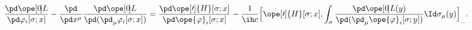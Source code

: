 \begin{equation}	\label{12.45}
\frac{\pd\ope[0\mspace{-3mu}]{L}}{\pd\varphi_i[\sigma;x]}
-
\frac{\pd}{\pd x^\mu}
\frac{\pd\ope[0\mspace{-3mu}]{L}}{\pd( \pd_\mu\varphi_i[\sigma;x] )}
 =
\frac{\pd\ope[\prime]{H}[\sigma;x]}{\pd\ope{\varphi}_i[\sigma;x] }
-
\frac{1}{\ih c}
\Bigl[
    \ope[\prime]{H}[\sigma;x]
    ,
\int_\sigma
	\frac{\pd\ope[0\mspace{-3mu}]{L}(y)}
	     {\pd( \pd_\mu\ope{\varphi}_i[\sigma;y] )}
\Id\sigma_\mu(y)
	\Bigr]_{\_} .
	\end{equation}

